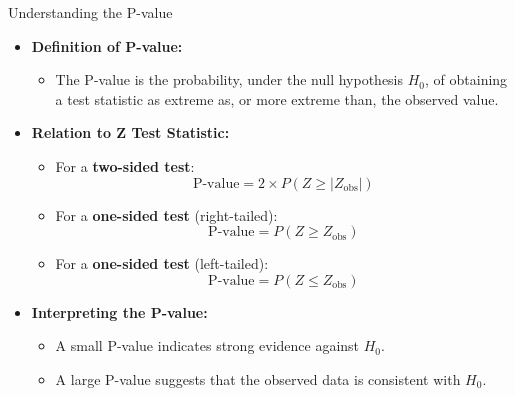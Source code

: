 \documentclass[handout]{beamer} %
\begin{document}
\begin{frame}{Understanding the P-value}
    \begin{itemize}
        \item \textbf{Definition of P-value:}
        \begin{itemize}
            \item The P-value is the probability, under the null hypothesis \( H_0 \), of obtaining a test statistic as extreme as, or more extreme than, the observed value.
        \end{itemize}
        \item \textbf{Relation to Z Test Statistic:}
        \begin{itemize}
            \item For a \textbf{two-sided test}:
            \[
                \text{P-value} = 2 \times P(Z \geq |Z_{\text{obs}}|)
            \]
            \item For a \textbf{one-sided test} (right-tailed):
            \[
                \text{P-value} = P(Z \geq Z_{\text{obs}})
            \]
            \item For a \textbf{one-sided test} (left-tailed):
            \[
                \text{P-value} = P(Z \leq Z_{\text{obs}})
            \]
        \end{itemize}
        \item \textbf{Interpreting the P-value:}
        \begin{itemize}
            \item A small P-value indicates strong evidence against \( H_0 \).
            \item A large P-value suggests that the observed data is consistent with \( H_0 \).
        \end{itemize}
    \end{itemize}
\end{frame}
\end{document}
